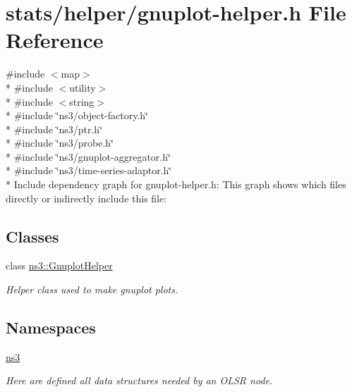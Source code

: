 \hypertarget{gnuplot-helper_8h}{}\section{stats/helper/gnuplot-\/helper.h File Reference}
\label{gnuplot-helper_8h}
{\ttfamily \#include $<$map$>$}\\*
{\ttfamily \#include $<$utility$>$}\\*
{\ttfamily \#include $<$string$>$}\\*
{\ttfamily \#include \char`\"{}ns3/object-\/factory.\+h\char`\"{}}\\*
{\ttfamily \#include \char`\"{}ns3/ptr.\+h\char`\"{}}\\*
{\ttfamily \#include \char`\"{}ns3/probe.\+h\char`\"{}}\\*
{\ttfamily \#include \char`\"{}ns3/gnuplot-\/aggregator.\+h\char`\"{}}\\*
{\ttfamily \#include \char`\"{}ns3/time-\/series-\/adaptor.\+h\char`\"{}}\\*
Include dependency graph for gnuplot-\/helper.h\+:
This graph shows which files directly or indirectly include this file\+:
\subsection*{Classes}
\begin{DoxyCompactItemize}
\item 
class \hyperlink{classns3_1_1GnuplotHelper}{ns3\+::\+Gnuplot\+Helper}
\begin{DoxyCompactList}\small\item\em Helper class used to make gnuplot plots. \end{DoxyCompactList}\end{DoxyCompactItemize}
\subsection*{Namespaces}
\begin{DoxyCompactItemize}
\item 
 \hyperlink{namespacens3}{ns3}
\begin{DoxyCompactList}\small\item\em Here are defined all data structures needed by an O\+L\+SR node. \end{DoxyCompactList}\end{DoxyCompactItemize}
